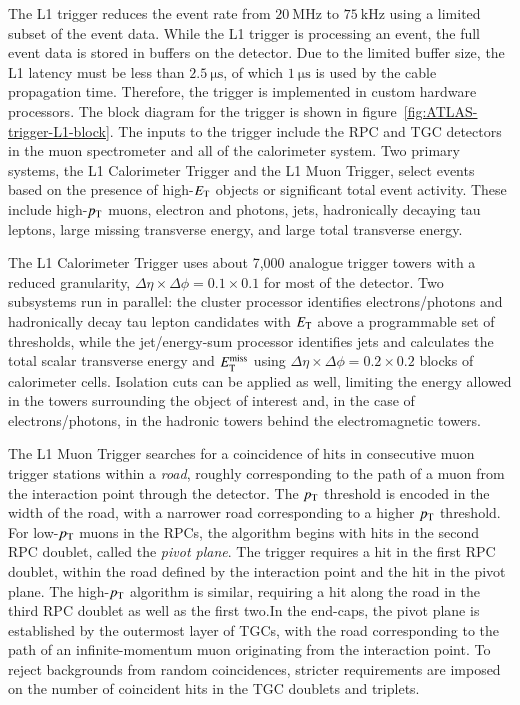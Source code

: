 The L1 trigger reduces the event rate from $\SI{20}{\mega\hertz}$ to $\SI{75}{\kilo\hertz}$ using a limited subset of the event data. While the L1 trigger is processing an event, the full event data is stored in buffers on the detector. Due to the limited buffer size, the L1 latency must be less than $\SI{2.5}{\micro\second}$, of which $\SI{1}{\micro\second}$ is used by the cable propagation time. Therefore, the trigger is implemented in custom hardware processors. The block diagram for the trigger is shown in figure~\ref{fig:ATLAS-trigger-L1-block}. The inputs to the trigger include the RPC and TGC detectors in the muon spectrometer and all of the calorimeter system.  Two primary systems, the L1 Calorimeter Trigger and the L1 Muon Trigger, select events based on the presence of high-$E_{\mathrm{T}}$ objects or significant total event activity. These include high-$p_{\text{T}}$ muons, electron and photons, jets, hadronically decaying tau leptons, large missing transverse energy, and large total transverse energy. 

The L1 Calorimeter Trigger uses about 7,000 analogue trigger towers with a reduced granularity, $\Delta\eta\times\Delta\phi=0.1\times0.1$ for most of the detector. Two subsystems run in parallel: the cluster processor identifies electrons/photons and hadronically decay tau lepton candidates with $E_{\mathrm{T}}$ above a programmable set of thresholds, while the jet/energy-sum processor identifies jets and calculates the total scalar transverse energy and $E_{\text{T}}^{\text{miss}}$ using $\Delta\eta\times\Delta\phi=0.2\times0.2$ blocks of calorimeter cells. Isolation cuts can be applied as well, limiting the energy allowed in the towers surrounding the object of interest and, in the case of electrons/photons, in the hadronic towers behind the electromagnetic towers. 

The L1 Muon Trigger searches for a coincidence of hits in consecutive muon trigger stations within a \emph{road}, roughly corresponding to the path of a muon from the interaction point through the detector. The $p_{\text{T}}$ threshold is encoded in the width of the road, with a narrower road corresponding to a higher $p_{\text{T}}$ threshold. For low-$p_{\text{T}}$ muons in the RPCs, the algorithm begins with hits in the second RPC doublet, called the \emph{pivot plane}. The trigger requires a hit in the first RPC doublet, within the road defined by the interaction point and the hit in the pivot plane. The high-$p_{\text{T}}$ algorithm is similar, requiring a hit along the road in the third RPC doublet as well as the first two.In the end-caps, the pivot plane is established by the outermost layer of TGCs, with the road corresponding to the path of an infinite-momentum muon originating from the interaction point. To reject backgrounds from random coincidences, stricter requirements are imposed on the number of coincident hits in the TGC doublets and triplets.

